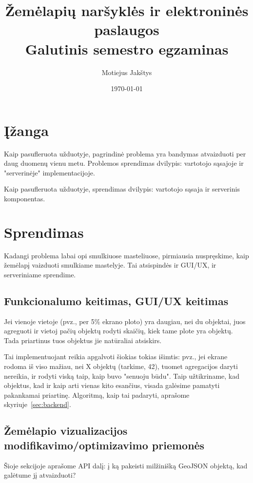 \documentclass{article}
\title{Žemėlapių naršyklės ir elektroninės paslaugos\\ \vspace{4mm} 
Galutinis semestro egzaminas}
\author{Motiejus Jakštys}
\date{\today}
\begin{document}
\maketitle

\section{Įžanga}

Kaip pasufleruota užduotyje, pagrindinė problema yra bandymas atvaizduoti per
daug duomenų vienu metu. Problemos sprendimas dvilypis: vartotojo sąsajoje ir
"serverinėje" implementacijoje.

Kaip pasufleruota užduotyje, sprendimas dvilypis: vartotojo sąsaja ir serverinis komponentas.

\section{Sprendimas}

Kadangi problema labai opi smulkiuose masteliuose, pirmiausia nuspręskime, kaip
žemėlapį vaizduoti smulkiame mastelyje. Tai atsispindės ir GUI/UX, ir
serveriniame sprendime.

\subsection{Funkcionalumo keitimas, GUI/UX keitimas}
\label{sec:ux}

Jei vienoje vietoje (pvz., per 5\% ekrano ploto) yra daugiau, nei du objektai,
juos agreguoti ir vietoj pačių objektų rodyti skaičių, kiek tame plote yra
objektų. Tada priartinus tuos objektus jie natūraliai atsiskirs.

Tai implementuojant reikia apgalvoti šiokias tokias išimtis: pvz., jei ekrane
rodoma iš viso mažiau, nei X objektų (tarkime, 42), tuomet agregacijos daryti
nereikia, ir rodyti viską taip, kaip buvo "senuoju būdu". Taip užtikriname, kad
objektus, kad ir kaip arti vienas kito esančius, visada galėsime pamatyti
pakankamai priartinę. Algoritmą, kaip tai padaryti, aprašome
skyriuje~\ref{sec:backend}.

\subsection{Žemėlapio vizualizacijos modifikavimo/optimizavimo priemonės}
\label{sec:api}

Šioje sekcijoje aprašome API dalį: į ką pakeisti milžinišką GeoJSON objektą,
kad galėtume jį atvaizduoti?
\end{document}
